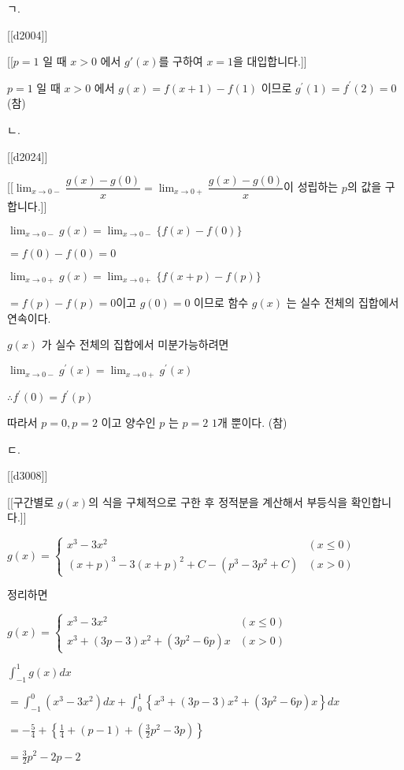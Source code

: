 \documentclass{oblivoir}
\begin{document}
ㄱ.

[[d2004]]

[[$p=1$ 일 때 $x>0$ 에서 $g'(x)$를 구하여 $x=1$을 대입합니다.]]

$p=1$ 일 때 $x>0$ 에서 $g(x)=f(x+1)-f(1)$ 이므로 $g^{\prime}(1)=f^{\prime}(2)=0$ (참)

ㄴ.

[[d2024]]

[[$\lim _{x \rightarrow 0-} \dfrac{g(x)-g(0)}{x} = \lim _{x \rightarrow 0+} \dfrac{g(x)-g(0)}{x}$이 성립하는 $p$의 값을 구합니다.]]

$\lim _{x \rightarrow 0-} g(x)=\lim _{x \rightarrow 0-}\{f(x)-f(0)\}$

$=f(0)-f(0)=0$

$\lim _{x \rightarrow 0+} g(x)=\lim _{x \rightarrow 0+}\{f(x+p)-f(p)\}$

$=f(p)-f(p)=0$이고 $g(0)=0$ 이므로 함수 $g(x)$ 는 실수 전체의 집합에서 연속이다.

$g(x)$ 가 실수 전체의 집합에서 미분가능하려면

$\lim _{x \rightarrow 0-} g^{\prime}(x)=\lim _{x \rightarrow 0+} g^{\prime}(x)$

$\therefore f^{\prime}(0)=f^{\prime}(p)$

따라서 $p=0, p=2$ 이고 양수인 $p$ 는 $p=2$ $1$개 뿐이다. (참)

ㄷ.

[[d3008]]

[[구간별로 $g(x)$의 식을 구체적으로 구한 후 정적분을 계산해서 부등식을 확인합니다.]]

$g(x)= \begin{cases}x^{3}-3 x^{2} & (x \leq 0)\\ (x+p)^{3}-3(x+p)^{2}+C-\left(p^{3}-3 p^{2}+C\right) &(x>0)\end{cases}$

정리하면

$g(x)=\begin{cases}
x^{3}-3 x^{2} & (x \leq 0)\\
x^{3}+(3 p-3) x^{2}+\left(3 p^{2}-6 p\right) x & (x>0)
\end{cases}$

$\int_{-1}^{1} g(x) d x$

$=\int_{-1}^{0}\left(x^{3}-3 x^{2}\right)dx+\int_{0}^{1}\left\{x^{3}+(3 p-3) x^{2}+\left(3 p^{2}-6 p\right) x\right\} d x$

$=-\frac{5}{4}+\left\{\frac{1}{4}+(p-1)+\left(\frac{3}{2} p^{2}-3 p\right)\right\}$

$=\frac{3}{2} p^{2}-2 p-2$
\end{document}
